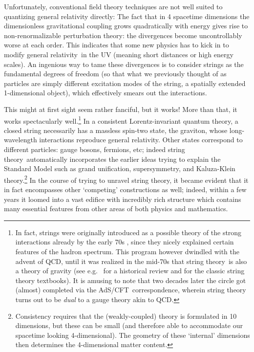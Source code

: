 \documentclass[12pt]{article}
\def\AC{AdS/CFT}
\def\GR{general relativity}
\def\STY{string theory}
\begin{document}
Unfortunately, conventional field theory techniques are not well suited to quantizing general relativity directly:
 The fact that in 4 spacetime dimensions the dimensionless gravitational coupling  grows quadratically with energy gives rise to non-renormalizable perturbation theory: the divergences become uncontrollably worse at each order.  This indicates that some new physics has to kick in
to modify \GR\
  in the UV (meaning short distances or high energy scales).
An ingenious way to tame these divergences is to consider strings as the fundamental degrees of freedom (so that what we previously thought of as particles are simply different excitation modes of the string, a spatially extended 1-dimensional object), which effectively smears out the interactions.

This might at first sight seem rather fanciful, but it works!  More than that, it works spectacularly well.\footnote{
In fact, strings were originally introduced as a possible theory of the strong interactions already by the early 70s , since they nicely explained certain features of the hadron spectrum.  This program however dwindled with the advent of QCD,  until it was realized in the mid-70s that \STY\ is also a theory of gravity  \cite{scherk1974dual} (see e.g.\ \cite{Schwarz:2012zc} for a historical review and  \cite{Green:1987sp,Polchinski:1998rq} for the classic string theory textbooks).  It is amusing to note that two decades later the circle got  (almost) completed  via the \AC\ correspondence, wherein string theory turns out to be {\it dual} to a gauge theory akin to QCD.
}  
In a consistent Lorentz-invariant quantum theory, a closed string necessarily has a massless spin-two state, the graviton, whose long-wavelength interactions reproduce \GR.  Other states correspond to different particles: gauge bosons, fermions, etc; indeed \STY\ automatically incorporates the earlier ideas trying to explain the Standard Model such as grand unification, supersymmetry, and Kaluza-Klein theory.\footnote{
Consistency requires that the (weakly-coupled) theory is formulated in 10 dimensions, but these can be small (and therefore able to accommodate our spacetime looking 4-dimensional). The geometry of these `internal' dimensions then determines the 4-dimensional matter content.
}
In the course of trying to unravel \STY, it became evident that it in fact encompasses other `competing' constructions as well; indeed, within a few years it loomed into a vast edifice with incredibly rich structure which contains many essential features from other areas of both physics and mathematics.
\end{document}
